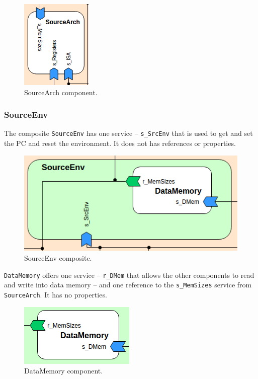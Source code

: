\documentclass{report}
\newcounter{subsubsubsection}[subsubsection]
\begin{document}
			\begin{figure} [H]
				\centering
				\includegraphics[width=0.25\linewidth]{Images/arch-ref/SourceArch}
				\caption{SourceArch component.}
				\label{fig:SourceArch}
			\end{figure}
		
			\subsubsection{SourceEnv}
			
			\par The composite \texttt{SourceEnv} has one service -- \texttt{s\_SrcEnv} that is used to get and set the PC and reset the environment. It does not has references or properties.
			
			\begin{figure} [H]
				\centering
				\includegraphics[width=0.5\linewidth]{Images/arch-ref/SourceEnv}
				\caption{SourceEnv composite.}
				\label{fig:SourceEnv}
			\end{figure}
		
				
				\par \texttt{DataMemory} offers one service -- \texttt{r\_DMem} that allows the other components to read and write into data memory -- and one reference to the \texttt{s\_MemSizes} service from \texttt{SourceArch}. It has no properties.
		
				\begin{figure} [H]
					\centering
					\includegraphics[width=0.3\linewidth]{Images/arch-ref/DataMemory}
					\caption{DataMemory component.}
					\label{fig:DataMemory}
				\end{figure}
		
\end{document}
